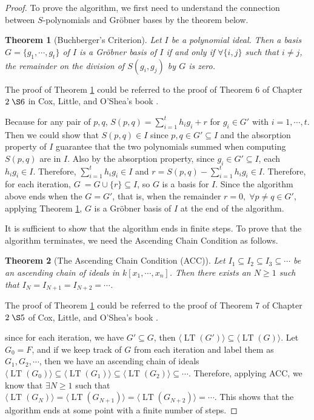 \documentclass{article}
\newtheorem{theorem}{Theorem}[section]
\newcommand{\lt}{\ensuremath{\operatorname{LT}}}
\theoremstyle{definition}
\theoremstyle{remark}
\theoremstyle{example}
\begin{document}
\begin{proof}

To prove the algorithm, we first need to understand the connection between $S$-polynomials and Gröbner bases by the theorem below.

\begin{theorem}[Buchberger's Criterion]\label{thm:buchCriter}
    Let $I$ be a polynomial ideal. Then a basis $G = \{g_1, \cdots, g_t\}$ of $I$ is a Gröbner basis of $I$ if and only if $\forall \{i,j\}$ such that $i \neq j$, the remainder on the division of $S(g_i,g_j)$ by $G$ is zero.
\end{theorem}

The proof of Theorem \ref{thm:buchCriter} could be referred to the proof of Theorem 6 of Chapter $2 \;\S6$ in Cox, Little, and O'Shea's book \cite{cox_grobner_2015}. 

Because for any pair of $p,q$, $S(p,q) = \sum_{i = 1}^{t}{h_ig_i} + r$ for $g_i \in G'$ with $i = 1, \cdots, t$. Then we could show that $S(p,q) \in I$ since $p,q \in G' \subseteq I$ and the absorption property of $I$ guarantee that the two polynomials summed when computing $S(p,q)$ are in $I$. Also by the absorption property, since $g_i \in G' \subseteq I$, each $h_ig_i \in I$. Therefore, $\sum_{i = 1}^{t}{h_ig_i} \in I$ and $r = S(p,q) -  \sum_{i = 1}^{t}{h_ig_i} \in I$. Therefore, for each iteration, $G\:=G\cup\{r\} \subseteq I$, so $G$ is a basis for $I$. Since the algorithm above ends when the $G = G'$, that is, when the remainder $r = 0, \; \forall p \neq q \in G'$, applying Theorem \ref{thm:buchCriter}, $G$ is a Gröbner basis of $I$ at the end of the algorithm.

It is sufficient to show that the algorithm ends in finite steps. To prove that the algorithm terminates, we need the Ascending Chain Condition as follows.

\begin{theorem}[The Ascending Chain Condition (ACC)]
    Let $I_1 \subseteq I_2 \subseteq I_3 \subseteq \cdots$ be an ascending chain of ideals in $k[x_1, \cdots, x_n]$. Then there exists an $N \geq 1$ such that $I_{N} = I_{N+1} = I_{N+2} = \cdots$.
\end{theorem}

The proof of Theorem \ref{thm:buchCriter} could be referred to the proof of Theorem 7 of Chapter $2 \;\S5$ of Cox, Little, and O'Shea's book \cite{cox_grobner_2015}. 

since for each iteration, we have $G' \subseteq G$, then $\langle \lt(G') \rangle \subseteq \langle \lt(G) \rangle$. Let $G_0 = F$, and if we keep track of $G$ from each iteration and label them as $G_1, G_2, \cdots$, then we have an ascending chain of ideals $\langle \lt(G_0) \rangle \subseteq \langle \lt(G_1) \rangle \subseteq \langle \lt(G_2) \rangle \subseteq \cdots$. Therefore, applying ACC, we know that $\exists N \geq 1$ such that $\langle \lt(G_{N}) \rangle = \langle \lt(G_{N+1}) \rangle = \langle \lt(G_{N+2}) \rangle = \cdots$. This shows that the algorithm ends at some point with a finite number of steps.
\end{proof}
\end{document}
